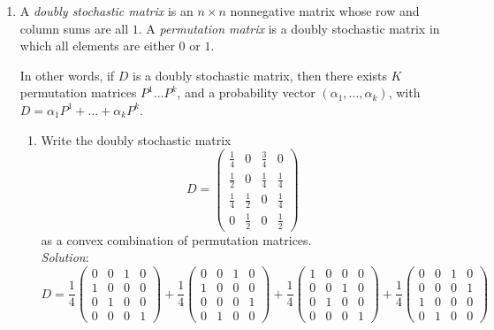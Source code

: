 \documentclass{article}
\begin{document}
\begin{enumerate}
\begin{enumerate}
    \end{enumerate}

\item A \textit{doubly stochastic matrix} is an $n \times n$ nonnegative matrix whose row and column sums are all $1$. A \textit{permutation matrix} is a doubly stochastic matrix in which all elements are either $0$ or $1$.

In other words, if $D$ is a doubly stochastic matrix, then there exists $K$ permutation matrices $P^{1} \dots P^{k}$, and a probability vector $(\alpha_{1}, \dots, \alpha_{k})$, with $D = \alpha_{1}P^{1} + \dots + \alpha_{k}P^{k}$.

    \begin{enumerate}
    \item Write the doubly stochastic matrix
    \[
    D = \begin{pmatrix}
    \frac{1}{4}  &  0            &  \frac{3}{4}  &  0           \\[0.3em]
    \frac{1}{2}  &  0            &  \frac{1}{4}  &  \frac{1}{4} \\[0.3em]
    \frac{1}{4}  &  \frac{1}{2}  &  0            &  \frac{1}{4} \\[0.3em]
    0            &  \frac{1}{2}  &  0            &  \frac{1}{2}
    \end{pmatrix}
    \]
    as a convex combination of permutation matrices. \\

    \textit{Solution}: \\

    \[
    D = \frac{1}{4} \begin{pmatrix}
      0 & 0 & 1 & 0 \\
      1 & 0 & 0 & 0 \\
      0 & 1 & 0 & 0 \\
      0 & 0 & 0 & 1
    \end{pmatrix} +
    \frac{1}{4} \begin{pmatrix}
      0 & 0 & 1 & 0 \\
      1 & 0 & 0 & 0 \\
      0 & 0 & 0 & 1 \\
      0 & 1 & 0 & 0
    \end{pmatrix} +
    \frac{1}{4} \begin{pmatrix}
      1 & 0 & 0 & 0 \\
      0 & 0 & 1 & 0 \\
      0 & 1 & 0 & 0 \\
      0 & 0 & 0 & 1
    \end{pmatrix} +
    \frac{1}{4} \begin{pmatrix}
      0 & 0 & 1 & 0 \\
      0 & 0 & 0 & 1 \\
      1 & 0 & 0 & 0 \\
      0 & 1 & 0 & 0
    \end{pmatrix}
    \]


\end{enumerate}
\end{enumerate}
\end{document}
